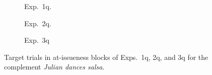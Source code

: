 \documentclass[11pt,fleqn]{article}
\newcommand{\6}{\mbox{$[\hspace*{-.6mm}[$}}
\newcommand{\9}{\mbox{$]\hspace*{-.6mm}]$}}
\begin{document}
\begin{figure}[h!]
\centering

\begin{subfigure}[t]{0.5\textwidth}
        \centering
{}
\caption{Exp.~1q.}\label{fig-exp1q-ai}
\end{subfigure}
\begin{subfigure}[t]{0.5\textwidth}
\centering
{} 
\caption{Exp.~2q.}\label{fig-exp2q-ai}
 \end{subfigure}%
\begin{subfigure}[t]{0.5\textwidth}
        \centering
{}
\caption{Exp.~3q}\label{fig-exp3q-ai}
 \end{subfigure}

\caption{Target trials in at-issueness blocks of Exps.~1q, 2q, and 3q for the complement {\em Julian dances salsa}.}\label{f-ai-trialsq}
\end{figure}
\end{document}
